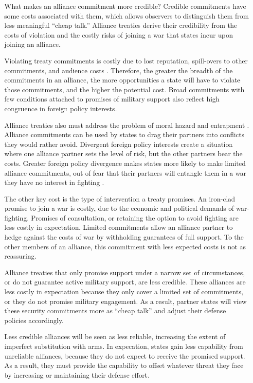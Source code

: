 \documentclass[12pt]{article}
\begin{document}
What makes an alliance commitment more credible? Credible commitments have some costs associated with them, which allows observers to distinguish them from less meaningful ``cheap talk.'' Alliance treaties derive their credibility from the costs of violation and the costly risks of joining a war that states incur upon joining an alliance. 

Violating treaty commitments is costly due to lost reputation, spill-overs to other commitments, and audience costs \citep{Fearon1997, Tomz2007ar, Chibaetal2015, Levyetal2015}. Therefore, the greater the breadth of the commitments in an alliance, the more opportunities a state will have to violate those commitments, and the higher the potential cost. Broad commitments with few conditions attached to promises of military support also reflect high congruence in foreign policy interests. 

Alliance treaties also must address the problem of moral hazard and entrapment \citep{Snyder1984, Benson2012}. Alliance commitments can be used by states to drag their partners into conflicts they would rather avoid. Divergent foreign policy interests create a situation where one alliance partner sets the level of risk, but the other partners bear the costs. Greater foreign policy divergence makes states more likely to make limited alliance commitments, out of fear that their partners will entangle them in a war they have no interest in fighting \citep{Benson2012}. 

The other key cost is the type of intervention a treaty promises. An iron-clad promise to join a war is costly, due to the economic and political demands of war-fighting. Promises of consultation, or retaining the option to avoid fighting are less costly in expectation. Limited commitments allow an alliance partner to hedge against the costs of war by withholding guarantees of full support. To the other members of an alliance, this commitment with less expected costs is not as reassuring. 

Alliance treaties that only promise support under a narrow set of circumstances, or do not guarantee active military support, are less credible. These alliances are less costly in expectation because they only cover a limited set of commitments, or they do not promise military engagement. As a result, partner states will view these security commitments more as ``cheap talk'' and adjust their defense policies accordingly. 

Less credible alliances will be seen as less reliable, increasing the extent of imperfect substitution with arms. In expecation, states gain less capability from unreliable alliances, because they do not expect to receive the promised support. As a result, they must provide the capability to offset whatever threat they face by increasing or maintaining their defense effort.
\end{document}
